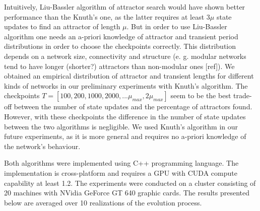 \documentclass[procedia]{easychair}
\begin{document}
	Intuitively, Liu-Bassler algorithm of attractor search would have shown better performance than the Knuth's one, as the latter requires at least $3 \mu$ state updates to find an attractor of length $\mu$. But in order to use Liu-Bassler algorithm one needs an a-priori knowledge of attractor and transient period distributions in order to choose the checkpoints correctly. This distribution depends on a network size, connectivity and structure (e. g. modular networks tend to have longer (shorter?) attractors than non-modular ones [ref]). We obtained an empirical distribution of attractor and transient lengths for different kinds of networks in our preliminary experiments with Knuth's algorithm. The checkpoints $T=[100, 200, 1000, 2000, ... \mu_{max}, 2 \mu_{max}]$ seem to be the best trade-off between the number of state updates and the percentage of attractors found. However, with these checkpoints the difference in the number of state updates between the two algorithms is negligible. We used Knuth's algorithm in our future experiments, as it is more general and requires no a-priori knowledge of the network's behaviour.
	
	Both algorithms were implemented using C++ programming language. The implementation is cross-platform and requires a GPU with CUDA compute capability at least 1.2. The experiments were conducted on a cluster consisting of 20 machines with NVidia GeForce GT 640 graphic cards. The results presented below are averaged over 10 realizations of the evolution process.
	
\end{document}
